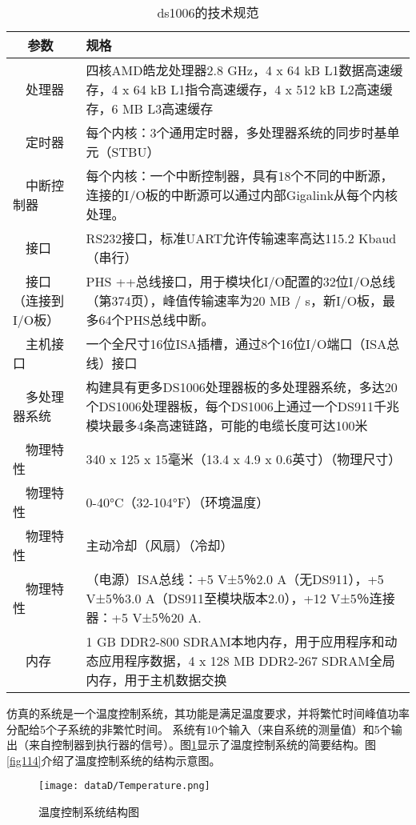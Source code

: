 \begin{table}[!htb]
\caption {ds1006的技术规范}
\label{algo:dspace}
\begin{tabular} {|p{4cm}|p{10cm}|} \hline \hline
  参数&规格\\ \hline
  处理器&四核AMD皓龙处理器2.8 GHz，4 x 64 kB L1数据高速缓存，4 x 64 kB L1指令高速缓存，4 x 512 kB L2高速缓存，6 MB L3高速缓存\\ \hline
  定时器&每个内核：3个通用定时器，多处理器系统的同步时基单元（STBU）\\ \hline
  中断控制器&每个内核：一个中断控制器，具有18个不同的中断源，连接的I/O板的中断源可以通过内部Gigalink从每个内核处理。 \\ \hline

  接口&RS232接口，标准UART允许传输速率高达115.2 Kbaud（串行）\\ \hline
  接口（连接到I/O板）&PHS ++总线接口，用于模块化I/O配置的32位I/O总线（第374页），峰值传输速率为20 MB / s，新I/O板，最多64个PHS总线中断。 \\ \hline

  主机接口&一个全尺寸16位ISA插槽，通过8个16位I/O端口（ISA总线）接口\\ \hline

  多处理器系统&构建具有更多DS1006处理器板的多处理器系统，多达20个DS1006处理器板，每个DS1006上通过一个DS911千兆模块最多4条高速链路，可能的电缆长度可达100米\\ \hline

  物理特性&340 x 125 x 15毫米（13.4 x 4.9 x 0.6英寸）（物理尺寸）\\ \hline
  物理特性&0-40°C（32-104°F）（环境温度）\\ \hline
  物理特性&主动冷却（风扇）（冷却）\\ \hline
  物理特性&（电源）ISA总线：+5 V±5％2.0 A（无DS911），+5 V±5％3.0 A（DS911至模块版本2.0），+12 V±5％连接器：+5 V±5％20 A. \\ \hline
  内存&1 GB DDR2-800 SDRAM本地内存，用于应用程序和动态应用程序数据，4 x 128 MB DDR2-267 SDRAM全局内存，用于主机数据交换\\ \hline\hline
\end{tabular}
\end{table}

仿真的系统是一个温度控制系统，其功能是满足温度要求，并将繁忙时间峰值功率分配给5个子系统的非繁忙时间。 系统有10个输入（来自系统的测量值）和5个输出（来自控制器到执行器的信号）。图\ref{fig113}显示了温度控制系统的简要结构。图\ref {fig114}介绍了温度控制系统的结构示意图。
	
	\begin{figure}[!htb]
		\centering
		\texttt{[image: dataD/Temperature.png]}
		\caption{温度控制系统结构图}
		\label{fig113}
	\end{figure}
	
